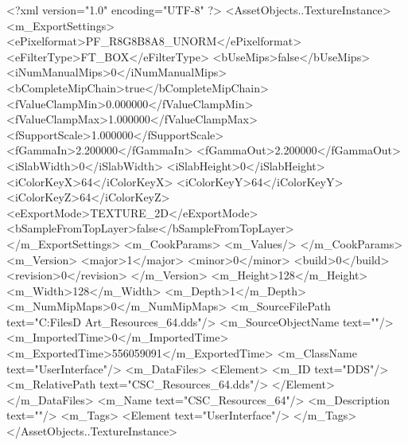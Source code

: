 <?xml version="1.0" encoding="UTF-8" ?>
<AssetObjects..TextureInstance>
	<m_ExportSettings>
		<ePixelformat>PF_R8G8B8A8_UNORM</ePixelformat>
		<eFilterType>FT_BOX</eFilterType>
		<bUseMips>false</bUseMips>
		<iNumManualMips>0</iNumManualMips>
		<bCompleteMipChain>true</bCompleteMipChain>
		<fValueClampMin>0.000000</fValueClampMin>
		<fValueClampMax>1.000000</fValueClampMax>
		<fSupportScale>1.000000</fSupportScale>
		<fGammaIn>2.200000</fGammaIn>
		<fGammaOut>2.200000</fGammaOut>
		<iSlabWidth>0</iSlabWidth>
		<iSlabHeight>0</iSlabHeight>
		<iColorKeyX>64</iColorKeyX>
		<iColorKeyY>64</iColorKeyY>
		<iColorKeyZ>64</iColorKeyZ>
		<eExportMode>TEXTURE_2D</eExportMode>
		<bSampleFromTopLayer>false</bSampleFromTopLayer>
	</m_ExportSettings>
	<m_CookParams>
		<m_Values/>
	</m_CookParams>
	<m_Version>
		<major>1</major>
		<minor>0</minor>
		<build>0</build>
		<revision>0</revision>
	</m_Version>
	<m_Height>128</m_Height>
	<m_Width>128</m_Width>
	<m_Depth>1</m_Depth>
	<m_NumMipMaps>0</m_NumMipMaps>
	<m_SourceFilePath text="C:\Users\Shadow\Desktop\Working Files\2D Art\Resources\CSC_Resources_64.dds"/>
	<m_SourceObjectName text=""/>
	<m_ImportedTime>0</m_ImportedTime>
	<m_ExportedTime>556059091</m_ExportedTime>
	<m_ClassName text="UserInterface"/>
	<m_DataFiles>
		<Element>
			<m_ID text="DDS"/>
			<m_RelativePath text="CSC_Resources_64.dds"/>
		</Element>
	</m_DataFiles>
	<m_Name text="CSC_Resources_64"/>
	<m_Description text=""/>
	<m_Tags>
		<Element text="UserInterface"/>
	</m_Tags>
</AssetObjects..TextureInstance>
